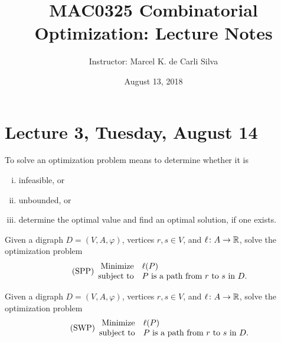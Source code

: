\documentclass[10pt,reqno]{amsart}
\title{MAC0325 Combinatorial Optimization: Lecture Notes}
\author{Instructor: Marcel {K.} de Carli Silva}
\date{August 13, 2018}
\begin{document}
\begin{abstract}

\end{abstract}

\maketitle

\tableofcontents

\setcounter{section}{3}

\section*{Lecture 3, Tuesday, August 14}

To solve an optimization problem means to determine whether it is
\begin{enumerate}[(i)]
\item infeasible, or
\item unbounded, or
\item determine the optimal value and find an optimal solution, if one
  exists.
\end{enumerate}

\begin{problem}
  Given a digraph \(D = (V,A,\varphi)\), vertices \(r,s \in V\), and
  \(\ell \colon A \to \mathbb{R}\), solve the optimization problem
  \begin{equation}
    \label{eq:1}
    \tag{SPP}
    \begin{array}{{rl}}
      \text{Minimize}   & \ell(P) \\
      \text{subject to} & \text{\(P\) is a path from \(r\) to \(s\) in~\(D\)}.
    \end{array}
  \end{equation}
\end{problem}

\begin{problem}
  Given a digraph \(D = (V,A,\varphi)\), vertices \(r,s \in V\), and
  \(\ell \colon A \to \mathbb{R}\), solve the optimization problem
  \begin{equation}
    \label{eq:2}
    \tag{SWP}
    \begin{array}{{rl}}
      \text{Minimize}   & \ell(P) \\
      \text{subject to} & \text{\(P\) is a path from \(r\) to \(s\) in~\(D\)}.
    \end{array}
  \end{equation}
\end{problem}
\end{document}
